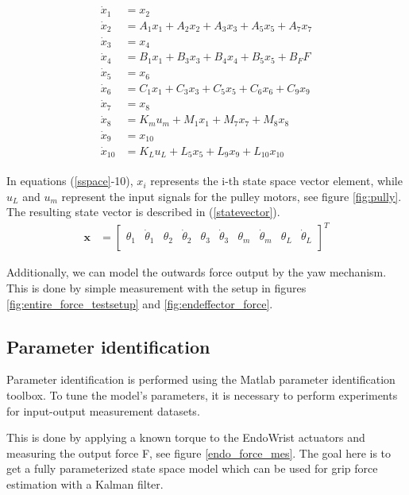 \begin{gather}\label{sspace}
\begin{align}
\dot{x}_1 &= x_2\\
\dot{x}_2 &= A_1x_1 + A_2x_2 + A_3x_3 + A_5x_5 + A_7x_7\\
\dot{x}_3 &= x_4\\
\dot{x}_4 &= B_1x_1 + B_3x_3 + B_4x_4 + B_5x_5 + B_FF\\
\dot{x}_5 &= x_6\\
\dot{x}_6 &= C_1x_1 + C_3x_3 + C_5x_5 + C_6x_6 + C_9x_9\\
\dot{x}_7 &= x_8\\
\dot{x}_8 &= K_mu_m + M_1x_1 + M_7x_7 + M_8x_8\\
\dot{x}_9 &= x_{10}\\
\dot{x}_{10} &= K_Lu_L + L_5x_5 + L_9x_9 + L_{10}x_{10}
\end{align}
\end{gather}


In equations (\ref{sspace}-10), $x_i$ represents the i-th state space vector element, while $u_L$ and $u_m$ represent the input signals for the pulley motors, see figure \ref{fig:pully}.
The resulting state vector is described in (\ref{statevector}).
\begin{align} \label{statevector}
\mathbf{x} &=
\begin{bmatrix}
\theta_1 &\dot{\theta}_1 &\theta_2 &\dot{\theta}_2 &\theta_3 &\dot{\theta}_3 &\theta_m &\dot{\theta}_m &\theta_L &\dot{\theta}_L \\
\end{bmatrix}^T
\end{align}


Additionally, we can model the outwards force output by the yaw mechanism.
This is done by simple measurement with the setup in figures \ref{fig:entire_force_testsetup} and \ref{fig:endeffector_force}.








\subsection{Parameter identification}
Parameter identification is performed using the Matlab parameter identification toolbox.
To tune the model’s parameters, it is necessary to perform experiments for input-output measurement datasets.


This is done by applying a known torque to the EndoWrist actuators and measuring the output force F, see figure \ref{endo_force_mes}.
The goal here is to get a fully parameterized state space model which can be used for grip force estimation with a Kalman filter.

